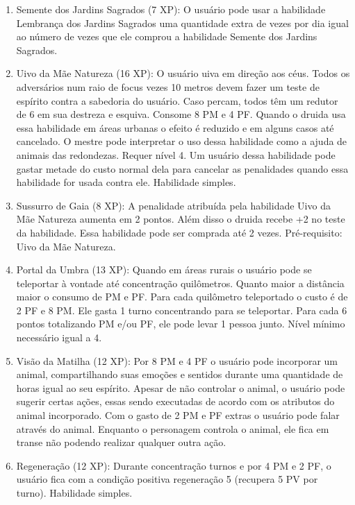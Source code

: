 \begin{enumerate}
			  \item Semente dos Jardins Sagrados (7 XP): O usuário pode usar a habilidade Lembrança dos Jardins Sagrados uma quantidade extra de vezes por dia igual ao número de vezes que ele comprou a habilidade Semente dos Jardins Sagrados.

  	\item Uivo da Mãe Natureza (16 XP): O usuário uiva em direção aos céus. Todos os adversários num raio de focus vezes 10 metros devem fazer um teste de espírito contra a sabedoria do usuário. Caso percam, todos têm um redutor de 6 em sua destreza e esquiva. Consome 8 PM e 4 PF. Quando o druida usa essa habilidade em áreas urbanas o efeito é reduzido e em alguns casos até cancelado. O mestre pode interpretar o uso dessa habilidade como a ajuda de animais das redondezas. Requer nível 4. Um usuário dessa habilidade pode gastar metade do custo normal dela para cancelar as penalidades quando essa habilidade for usada contra ele. Habilidade simples.
	  
    \item Sussurro de Gaia (8 XP): A penalidade atribuída pela habilidade Uivo da Mãe Natureza aumenta em 2 pontos. Além disso o druida recebe +2 no teste da habilidade. Essa habilidade pode ser comprada até 2 vezes. Pré-requisito: Uivo da Mãe Natureza.
  
  	\item Portal da Umbra (13 XP): Quando em áreas rurais o usuário pode se teleportar à vontade até concentração quilômetros. Quanto maior a distância maior o consumo de PM e PF. Para cada quilômetro teleportado o custo é de 2 PF e 8 PM. Ele gasta 1 turno concentrando para se teleportar. Para cada 6 pontos totalizando PM e/ou PF, ele pode levar 1 pessoa junto. Nível mínimo necessário igual a 4.
  
  	\item Visão da Matilha (12 XP): Por 8 PM e 4 PF o usuário pode incorporar um animal, compartilhando suas emoções e sentidos durante uma quantidade de horas igual ao seu espírito. Apesar de não controlar o animal, o usuário pode sugerir certas ações, essas sendo executadas de acordo com os atributos do animal incorporado. Com o gasto de 2 PM e PF extras o usuário pode falar através do animal. Enquanto o personagem controla o animal, ele fica em transe não podendo realizar qualquer outra ação.
  
    \item Regeneração (12 XP): Durante concentração turnos e por 4 PM e 2 PF, o usuário fica com a condição positiva regeneração 5 (recupera 5 PV por turno). Habilidade simples.


\end{enumerate}
